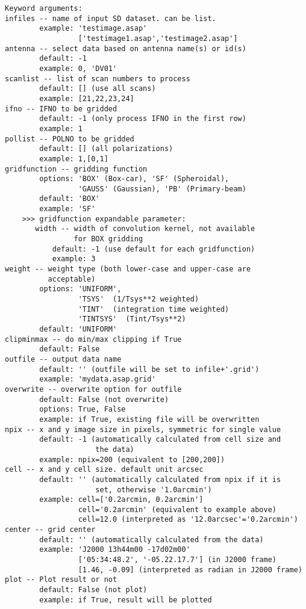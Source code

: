 \begin{verbatim}
Keyword arguments:
infiles -- name of input SD dataset. can be list.
        example: 'testimage.asap' 
                 ['testimage1.asap','testimage2.asap']
antenna -- select data based on antenna name(s) or id(s)
        default: -1
        example: 0, 'DV01'
scanlist -- list of scan numbers to process
        default: [] (use all scans)
        example: [21,22,23,24]
ifno -- IFNO to be gridded
        default: -1 (only process IFNO in the first row)
        example: 1
pollist -- POLNO to be gridded
        default: [] (all polarizations)
        example: 1,[0,1]
gridfunction -- gridding function 
        options: 'BOX' (Box-car), 'SF' (Spheroidal), 
                 'GAUSS' (Gaussian), 'PB' (Primary-beam)
        default: 'BOX'
        example: 'SF'
    >>> gridfunction expandable parameter:
       width -- width of convolution kernel, not available 
                for BOX gridding
           default: -1 (use default for each gridfunction)
           example: 3
weight -- weight type (both lower-case and upper-case are 
          acceptable)
        options: 'UNIFORM',
                 'TSYS'  (1/Tsys**2 weighted)
                 'TINT'  (integration time weighted)
                 'TINTSYS'  (Tint/Tsys**2)
        default: 'UNIFORM'
clipminmax -- do min/max clipping if True
        default: False
outfile -- output data name
        default: '' (outfile will be set to infile+'.grid')
        example: 'mydata.asap.grid'
overwrite -- overwrite option for outfile
        default: False (not overwrite)
        options: True, False
        example: if True, existing file will be overwritten
npix -- x and y image size in pixels, symmetric for single value
        default: -1 (automatically calculated from cell size and 
                     the data)
        example: npix=200 (equivalent to [200,200])
cell -- x and y cell size. default unit arcsec
        default: '' (automatically calculated from npix if it is 
                     set, otherwise '1.0arcmin')
        example: cell=['0.2arcmin, 0.2arcmin']
                 cell='0.2arcmin' (equivalent to example above)
                 cell=12.0 (interpreted as '12.0arcsec'='0.2arcmin')
center -- grid center
        default: '' (automatically calculated from the data)
        example: 'J2000 13h44m00 -17d02m00'
                 ['05:34:48.2', '-05.22.17.7'] (in J2000 frame)
                 [1.46, -0.09] (interpreted as radian in J2000 frame)
plot -- Plot result or not
        default: False (not plot)
        example: if True, result will be plotted
\end{verbatim}

